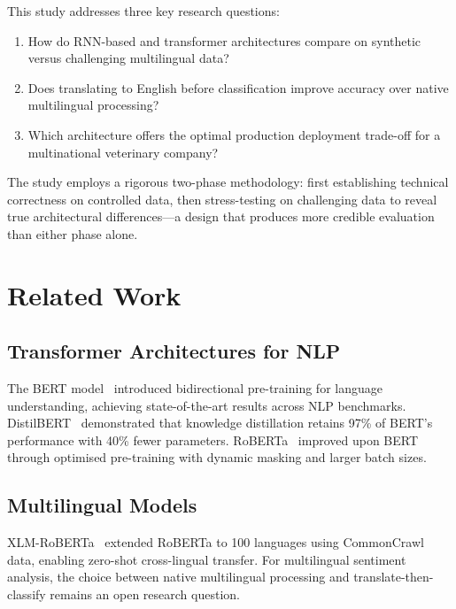 \documentclass[10pt,twocolumn,a4paper]{article}
\begin{document}
This study addresses three key research questions:
\begin{enumerate}[leftmargin=*,noitemsep,topsep=2pt]
    \item[\textbf{RQ1:}] How do RNN-based and transformer architectures compare on synthetic versus challenging multilingual data?
    \item[\textbf{RQ2:}] Does translating to English before classification improve accuracy over native multilingual processing?
    \item[\textbf{RQ3:}] Which architecture offers the optimal production deployment trade-off for a multinational veterinary company?
\end{enumerate}

The study employs a rigorous two-phase methodology: first establishing technical correctness on controlled data, then stress-testing on challenging data to reveal true architectural differences---a design that produces more credible evaluation than either phase alone.

\section{Related Work}
\label{sec:related}

\subsection{Transformer Architectures for NLP}
The BERT model~\cite{devlin2019bert} introduced bidirectional pre-training for language understanding, achieving state-of-the-art results across NLP benchmarks. DistilBERT~\cite{sanh2019distilbert} demonstrated that knowledge distillation retains 97\% of BERT's performance with 40\% fewer parameters. RoBERTa~\cite{liu2019roberta} improved upon BERT through optimised pre-training with dynamic masking and larger batch sizes.

\subsection{Multilingual Models}
XLM-RoBERTa~\cite{conneau2020unsupervised} extended RoBERTa to 100 languages using CommonCrawl data, enabling zero-shot cross-lingual transfer. For multilingual sentiment analysis, the choice between native multilingual processing and translate-then-classify remains an open research question.
\end{document}
